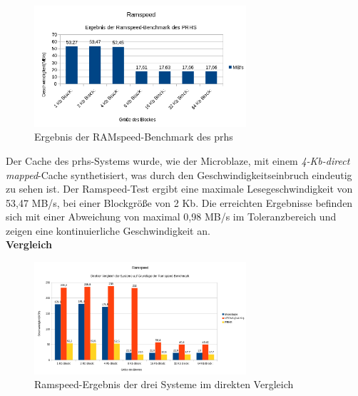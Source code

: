 \begin{figure}[H]
\centering
\includegraphics[width=0.7\textwidth]{Hauptteil/ramspeedprhs.png}
\caption{Ergebnis der RAMspeed-Benchmark des \ac{prhs}}
\label{fig:ramspeedprhs}
\end{figure}

Der Cache des \ac{prhs}-Systems wurde, wie der Microblaze, mit einem \emph{4-Kb-direct mapped}-Cache synthetisiert, was durch den Geschwindigkeitseinbruch eindeutig zu sehen ist. Der
Ramspeed-Test ergibt eine maximale Lesegeschwindigkeit von 53,47 MB/s, bei einer Blockgröße von 2 Kb. Die erreichten Ergebnisse befinden sich mit einer Abweichung von maximal 0,98 MB/s
im Toleranzbereich und zeigen eine kontinuierliche Geschwindigkeit an.\\

\textbf{Vergleich}

\begin{figure}[H]
\centering
\includegraphics[width=0.7\textwidth]{Hauptteil/ramspeedresult.png}
\caption{Ramspeed-Ergebnis der drei Systeme im direkten Vergleich}
\label{fig:ramspeedresult}
\end{figure}


